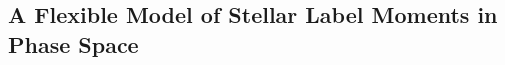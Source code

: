 \documentclass[modern]{aastex631}
\begin{document}


\subsection{A Flexible Model of Stellar Label Moments in Phase Space}
\label{sec:oti-fourier}
\end{document}
